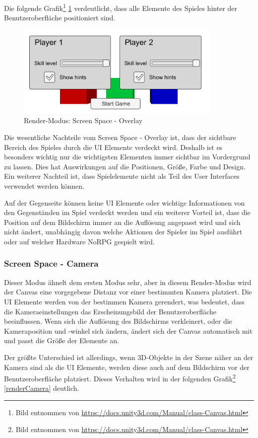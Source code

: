 Die folgende Grafik\footnote{Bild entnommen von \url{https://docs.unity3d.com/Manual/class-Canvas.html}} \ref{renderOverlay} verdeutlicht, dass alle Elemente des Spieles hinter der Benutzeroberfläche positioniert sind.

\begin{figure}[htbp]
	\centering 
	\label{renderOverlay}
	\includegraphics[width=10cm]{pics/CanvasOverlay.png}
	\caption{Render-Modus: Screen Space - Overlay}
\end{figure}

Die wesentliche Nachteile vom Screen Space - Overlay ist, dass der sichtbare Bereich des Spieles durch die UI Elemente verdeckt wird. Deshalb ist es besonders wichtig nur die wichtigsten Elementen immer sichtbar im Vordergrund zu lassen. Dies hat Auswirkungen auf die Positionen, Größe, Farbe und Design. Ein weiterer Nachteil ist, dass Spielelemente nicht als Teil des User Interfaces verwendet werden können. 

Auf der Gegenseite können keine UI Elemente oder wichtige Informationen von den Gegenständen im Spiel verdeckt werden und ein weiterer Vorteil ist, dass die Position auf dem Bildschirm immer an die Auflösung angepasst wird und sich nicht ändert, unabhängig davon welche Aktionen der Spieler im Spiel ausführt oder auf welcher Hardware NoRPG gespielt wird.

\subsubsection{Screen Space - Camera}
Dieser Modus ähnelt dem ersten Modus sehr, aber in diesem Render-Modus wird der Canvas eine vorgegebene Distanz vor einer bestimmten Kamera platziert. Die UI Elemente werden von der bestimmen Kamera gerendert, was bedeutet, dass die Kameraeinstellungen das Erscheinungsbild der Benutzeroberfläche beeinflussen. Wenn sich die Auflösung des Bildschirms verkleinert, oder die Kameraposition und -winkel sich ändern, ändert sich der Canvas automatisch mit und passt die Größe der Elemente an.

Der größte Unterschied ist allerdings, wenn 3D-Objekte in der Szene näher an der Kamera sind als die UI Elemente, werden diese auch auf dem Bildschirm vor der Benutzeroberfläche platziert. Dieses Verhalten wird in der folgenden Grafik\footnote{Bild entnommen von \url{https://docs.unity3d.com/Manual/class-Canvas.html}} \ref{renderCamera} deutlich.

